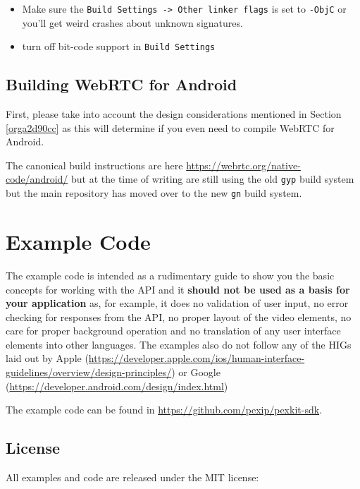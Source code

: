 \documentclass[a4paper,11pt]{article}
\begin{document}
\begin{itemize}
\item Make sure the \texttt{Build Settings -> Other linker flags} is set to
\texttt{-ObjC} or you’ll get weird crashes about unknown signatures.
\item turn off bit-code support in \texttt{Build Settings}
\end{itemize}

\subsection{Building WebRTC for Android}
\label{sec:org953b2bc}

\label{orgddd20c4}

First, please take into account the design considerations mentioned in
Section \ref{orga2d90cc} as this will determine if you
even need to compile WebRTC for Android.

The canonical build instructions are here
\url{https://webrtc.org/native-code/android/} but at the time of writing are
still using the old \texttt{gyp} build system but the main repository has
moved over to the new \texttt{gn} build system.


\section{Example Code}
\label{sec:org1d029f8}
\label{org89c5bf9}

The example code is intended as a rudimentary guide to show you the
basic concepts for working with the API and it \textbf{should not be used as
a basis for your application} as, for example, it does no validation
of user input, no error checking for responses from the API, no proper
layout of the video elements, no care for proper background operation
and no translation of any user interface elements into other
languages.  The examples also do not follow any of the HIGs laid out
by Apple
(\url{https://developer.apple.com/ios/human-interface-guidelines/overview/design-principles/})
or Google (\url{https://developer.android.com/design/index.html})

The example code can be found in \url{https://github.com/pexip/pexkit-sdk}.

\subsection{License}
\label{sec:orgd269c8e}

All examples and code are released under the MIT license:
\end{document}
